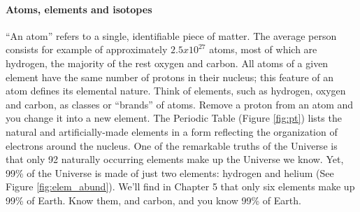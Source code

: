 \documentclass[amstex,12pt]{book}
\begin{document}
\paragraph{Atoms, elements and isotopes}
``An atom'' refers to a single, identifiable piece of matter. The average person consists for example of approximately $2.5x10^{27}$ atoms, most of which are hydrogen, the majority of the rest oxygen and carbon. All atoms of a given element have the same number of protons in their nucleus; this feature of an atom defines its elemental nature. Think of elements, such as hydrogen, oxygen and carbon, as classes or ``brands'' of atoms. Remove a proton from an atom and you change it into a new element. The Periodic Table (Figure \ref{fig:pt}) lists the natural and artificially-made elements in a form reflecting the organization of electrons around the nucleus. One of the remarkable truths of the Universe is that only 92 naturally occurring elements make up the Universe we know. Yet, 99\% of the Universe is made of just two elements: hydrogen and helium (See Figure \ref{fig:elem_abund}). We'll find in Chapter 5 that only six elements make up 99\% of Earth. Know them, and carbon, and you know 99\% of Earth.\\
\end{document}
